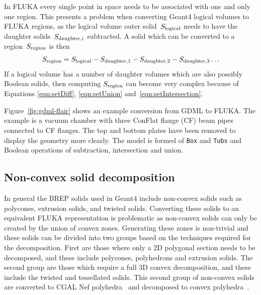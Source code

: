 \documentclass[final,5p,times,twocolumn]{elsarticle}
\begin{document}
In FLUKA every single point in space needs to be associated with one and only one region. This presents a problem
when converting Geant4 logical volumes to FLUKA regions, as the logical volume outer solid~$S_{\rm logical}$
needs to have the daughter  solids~$S_{{\rm daughter},i}$ subtracted. A solid which can be converted
to a region~$S_{\rm region}$ is then
\begin{equation}
S_{\rm region} =  S_{\rm logical} - S_{\rm daughter,1} - S_{\rm daughter,2} - S_{\rm daughter,3} \ldots
\label{eqn:logicalSubtraction}
\end{equation}
If a logical volume has a number of daughter volumes which are also possibly Boolean solids, then computing
$S_{\rm region}$ can become very complex because of Equations \ref{eqn:setDiff}, \ref{eqn:setUnion} and~\ref{eqn:setIntersection}.

Figure~\ref{fig:gdml-flair} shows an example conversion from GDML to FLUKA. The example is a
vacuum chamber with three ConFlat flange (CF) beam pipes connected to CF flanges. The top and bottom plates
have been removed to display the geometry more clearly. The model is formed of \verb|Box| and
\verb|Tubs| and Boolean operations of subtraction, intersection and union.

\subsection{Non-convex solid decomposition}
In general the BREP solids used in Geant4 include non-convex solids such
as polycones, extrusion solids, and twisted solids.  Converting these
solids to an equivalent FLUKA representation is problematic as non-convex
solids can only be created by the union of convex zones. Generating these
zones is non-trivial and these solids can be divided into two groups based
on the techniques required for the decomposition.  First are those where only a 2D polygonal
section needs to be decomposed, and these include polycones, polyhedrons
and extrusion solids.  The second group are those which require a full 3D
convex decomposition, and these include the twisted and tessellated solids.
This second group of non-convex solids are converted to CGAL Nef
polyhedra~\cite{cgal:hk-bonp3-20b} and decomposed to convex
polyhedra~\cite{cgal:h-emspe-20b}.
\end{document}
